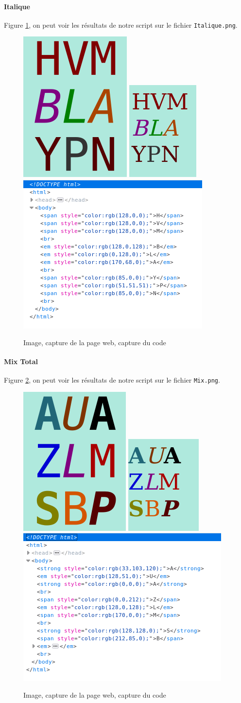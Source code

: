 \documentclass[a4paper,12pt,titlepage]{report}
\begin{document}
	\paragraph{Italique}
	Figure \ref{it}, on peut voir les résultats de notre script sur le fichier \texttt{Italique.png}.
	\begin{figure}[!h]
	\centering
		\includegraphics[height=0.2\textwidth]{../illus/Italique.png}
		\includegraphics[height=0.2\textwidth]{../illus/ItaliqueR.png}
		\includegraphics[height=0.2\textwidth]{../illus/ItaliqueC.png}
		\caption{Image, capture de la page web, capture du code}
		\label{it}
	\end{figure}
	\paragraph{Mix Total}
	Figure \ref{mix}, on peut voir les résultats de notre script sur le fichier \texttt{Mix.png}.
	\begin{figure}[!h]
	\centering
		\includegraphics[height=0.2\textwidth]{../illus/Mix.png}
		\includegraphics[height=0.2\textwidth]{../illus/MixR.png}
		\includegraphics[height=0.2\textwidth]{../illus/MixC.png}
		\caption{Image, capture de la page web, capture du code}
		\label{mix}
	\end{figure}
\end{document}
